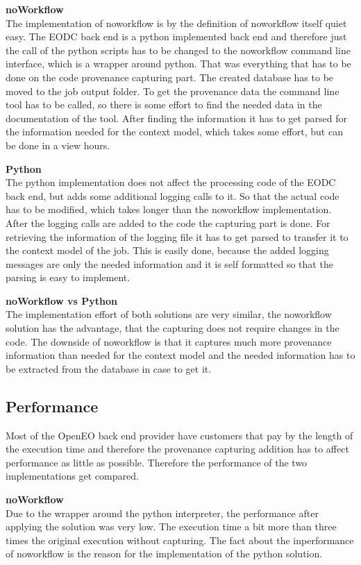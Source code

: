 \documentclass[draft,final]{vutinfth} %
\begin{document}
\textbf{noWorkflow} \\
The implementation of noworkflow is by the definition of noworkflow itself quiet easy. The EODC back end is a python implemented back end and therefore just the call of the python scripts has to be changed to the noworkflow command line interface, which is a wrapper around python. That was everything that has to be done on the code provenance capturing part. The created database has to be moved to the job output folder. To get the provenance data the command line tool has to be called, so there is some effort to find the needed data in the documentation of the tool. After finding the information it has to get parsed for the information needed for the context model, which takes some effort, but can be done in a view hours. 

\textbf{Python} \\
The python implementation does not affect the processing code of the EODC back end, but adds some additional logging calls to it. So that the actual code has to be modified, which takes longer than the noworkflow implementation. After the logging calls are added to the code the capturing part is done. For retrieving the information of the logging file it has to get parsed to transfer it to the context model of the job. This is easily done, because the added logging messages are only the needed information and it is self formatted so that the parsing is easy to implement.   

\textbf{noWorkflow vs Python} \\
The implementation effort of both solutions are very similar, the noworkflow solution has the advantage, that the capturing does not require changes in the code. The downside of noworkflow is that it captures much more provenance information than needed for the context model and the needed information has to be extracted from the database in case to get it. 

\subsection{Performance}\label{NvsP:Performance}
Most of the OpenEO back end provider have customers that pay by the length of the execution time and therefore the provenance capturing addition has to affect performance as little as possible. Therefore the performance of the two implementations get compared.

\textbf{noWorkflow} \\
Due to the wrapper around the python interpreter, the performance after applying the solution was very low. The execution time a bit more than three times the original execution without capturing. The fact about the inperformance of noworkflow is the reason for the implementation of the python solution. 
\end{document}
